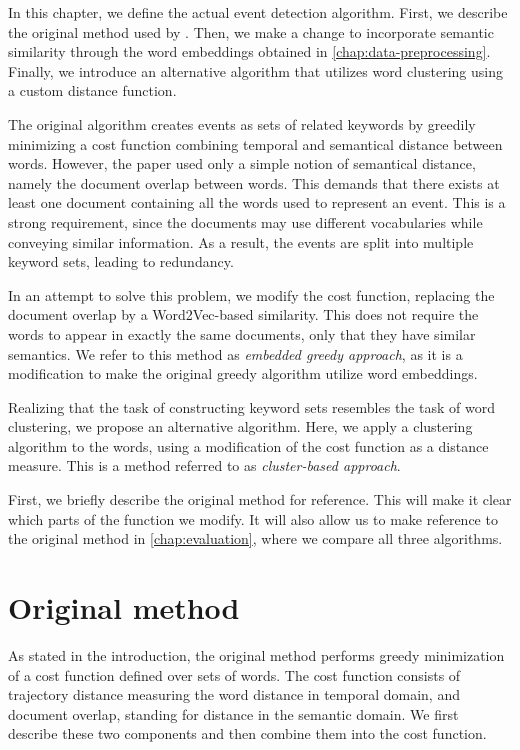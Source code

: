 In this chapter, we define the actual event detection algorithm. First, we describe the original method used by \cite{event-detection}. Then, we make a change to incorporate semantic similarity through the word embeddings obtained in \autoref{chap:data-preprocessing}. Finally, we introduce an alternative algorithm that utilizes word clustering using a custom distance function.

The original algorithm creates events as sets of related keywords by greedily minimizing a cost function combining temporal and semantical distance between words. However, the paper used only a simple notion of semantical distance, namely the document overlap between words. This demands that there exists at least one document containing all the words used to represent an event. This is a strong requirement, since the documents may use different vocabularies while conveying similar information.  As a result, the events are split into multiple keyword sets, leading to redundancy.

In an attempt to solve this problem, we modify the cost function, replacing the document overlap by a Word2Vec-based similarity. This does not require the words to appear in exactly the same documents, only that they have similar semantics. We refer to this method as \textit{embedded greedy approach}, as it is a modification to make the original greedy algorithm utilize word embeddings.

Realizing that the task of constructing keyword sets resembles the task of word clustering, we propose an alternative algorithm. Here, we apply a clustering algorithm to the words, using a modification of the cost function as a distance measure. This is a method referred to as \textit{cluster-based approach}.

First, we briefly describe the original method for reference. This will make it clear which parts of the function we modify. It will also allow us to make reference to the original method in \autoref{chap:evaluation}, where we compare all three algorithms.

\section{Original method}
As stated in the introduction, the original method performs greedy minimization of a cost function defined over sets of words. The cost function consists of trajectory distance measuring the word distance in temporal domain, and document overlap, standing for distance in the semantic domain. We first describe these two components and then combine them into the cost function.

